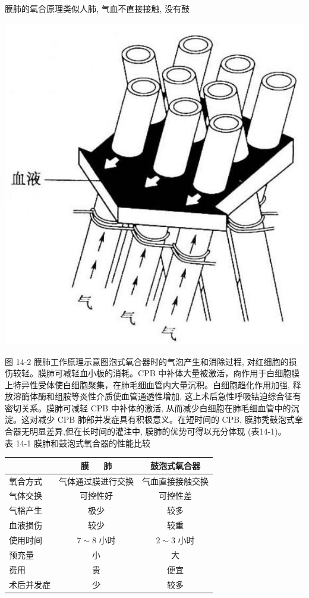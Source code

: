 \documentclass[10pt]{article}
\begin{document}
膜肺的氧合原理类似人肺, 气血不直接接触, 没有鼓

\begin{center}
\includegraphics[max width=\textwidth]{2024_07_09_002a177993bd97d1d6d7g-150}
\end{center}

图 14-2 膜肺工作原理示意图泡式氧合器时的气泡产生和消除过程, 对红细胞的损伤较轻。膜肺可减轻血小板的消耗。CPB 中补体大量被激活，㕯作用于白细胞膜上特异性受体使白细胞聚集，在肺毛细血管内大量沉积。白细胞趋化作用加强, 释放溶酶体酶和组胺等炎性介质使血管通透性增加, 这上术后急性呼吸钴迫综合征有密切关系。膜肺可减轻 CPB 中补体的激活, 从而减少白细胞在肺毛细血管中的沉淀。这对减少 CPB 肺部并发症具有积极意义。在短时间的 CPB, 膜肺秃鼓泡式羍合器无明显差异,但在长时间的灌注中, 膜肺的优势可得以充分体现 (表14-1)。\\
表 14-1 膜肺和鼓泡式氧合器的性能比较

\begin{center}
\begin{tabular}{lcc}
\hline
 & 膜 $\quad$ 肺 & 鼓泡式氧合器 \\
\hline
氧合方式 & 气体通过膜进行交换 & 气血直接接触交换 \\
气体交换 & 可控性好 & 可控性差 \\
气㭲产生 & 极少 & 较多 \\
血液损伤 & 较少 & 较重 \\
使用时间 & $7 \sim 8$ 小时 & $2 \sim 3$ 小时 \\
预充量 & 小 & 大 \\
费用 & 贵 & 便宜 \\
术后并发症 & 少 & 较多 \\
\hline
\end{tabular}
\end{center}
\end{document}
